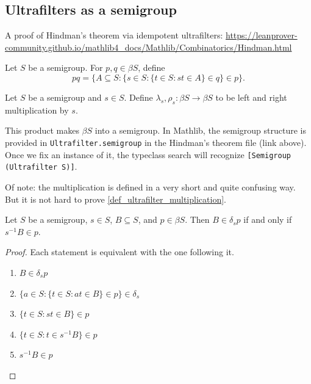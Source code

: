 \subsection{Ultrafilters as a semigroup}

\begin{leanrmk}
    A proof of Hindman's theorem via idempotent ultrafilters: \url{https://leanprover-community.github.io/mathlib4_docs/Mathlib/Combinatorics/Hindman.html}
\end{leanrmk}

\begin{definition}
\label{def_ultrafilter_multiplication}
\mathlibok
    Let $S$ be a semigroup.  For $p, q \in \beta S$, define
    \[pq = \{A \subseteq S : \{s \in S : \{t \in S : st \in A\} \in q \} \in p \}.\]
\end{definition}

\begin{definition}
Let $S$ be a semigroup and $s \in S$.  Define $\lambda_s, \rho_s: \beta S \to \beta S$ to be left and right multiplication by $s$.
\end{definition}

\begin{leanrmk}
    This product makes $\beta S$ into a semigroup.  In Mathlib, the semigroup structure is provided in \verb|Ultrafilter.semigroup| in the Hindman's theorem file (link above).  Once we fix an instance of it, the typeclass search will recognize \verb|[Semigroup (Ultrafilter S)]|.

    Of note: the multiplication is defined in a very short and quite confusing way.  But it is not hard to prove \cref{def_ultrafilter_multiplication}.
\end{leanrmk}

\begin{lemma}
\label{lemma_ultrafilter_mult_with_one_principal}
\leanok{}
    Let $S$ be a semigroup, $s \in S$, $B \subseteq S$, and $p \in \beta S$. Then $B \in \delta_s p$ if and only if $s^{-1} B \in p$.
\end{lemma}

\begin{proof}
\leanok{}
    Each statement is equivalent with the one following it.
    \begin{enumerate}
        \item $B \in \delta_s p$
        \item $\{a \in S : \{t \in S : at \in B \} \in p \} \in \delta_s$
        \item $\{t \in S : st \in B \} \in p$
        \item $\{t \in S : t \in s^{-1}B \} \in p$
        \item $s^{-1}B \in p$
    \end{enumerate}
\end{proof}

